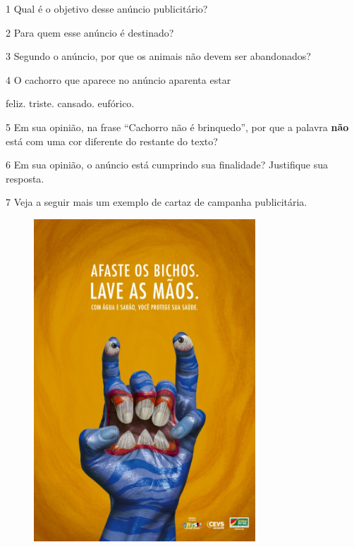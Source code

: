 

\num{1} Qual é o objetivo desse anúncio publicitário? 


\num{2} Para quem esse anúncio é destinado? 


\pagebreak
\num{3} Segundo o anúncio, por que os animais não devem ser abandonados? 


\num{4} O cachorro que aparece no anúncio aparenta estar

\begin{boxlist}
   feliz.
   triste.
   cansado.
   eufórico.
\end{boxlist}

\num{5} Em sua opinião, na frase ``Cachorro não é brinquedo'', por que a palavra \textbf{não} está com uma cor diferente do restante do texto?


\num{6} Em sua opinião, o anúncio está cumprindo sua finalidade? Justifique
sua resposta. 


\num{7} Veja a seguir mais um exemplo de cartaz de campanha publicitária.


\begin{figure}[htpb!]
\centering
\includegraphics[width=3.27083in,height=4.76432in]{./media/image10.jpeg}
\end{figure}

